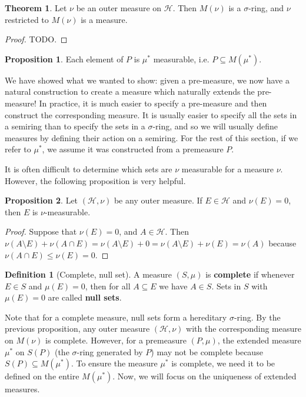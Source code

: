 \documentclass[11pt, oneside]{amsart}   	%
\theoremstyle{definition}
\newtheorem{definition}{Definition}[section]
\newtheorem{theorem}{Theorem}[section]
\newtheorem{prop}{Proposition}[section]
\begin{document}
	\begin{theorem}
		Let $\nu$ be an outer measure on $\mathcal H$. Then $M(\nu)$ is a $\sigma$-ring, and $\nu$ restricted to $M(\nu)$ 
		is a 
		measure.
	\end{theorem}
	
	\begin{proof}
		TODO.
	\end{proof}
	
	\begin{prop}
		Each element of $P$ is $\mu^*$ measurable, i.e. $P\subseteq M(\mu^*)$. 
	\end{prop}
	
	We have showed what we wanted to show: given a pre-measure, we now have a natural construction to create a measure 
	which naturally extends the pre-measure! In practice, it is much easier to specify a pre-measure and then construct the 
	corresponding measure. It is usually easier to specify all the sets in a semiring than to specify the sets in a $\sigma$-ring, 
	and so we will usually define measures by defining their action on a semiring. For the rest of this section, if we refer to 
	$\mu^*$, we assume it was constructed from a premeasure $P$. 
	
	It is often difficult to determine which sets are $\nu$ measurable for a measure $\nu$. However, the following proposition 
	is very helpful.
	
	\begin{prop}
		Let $(\mathcal H, \nu)$ be any outer measure. If $E\in\mathcal H$ and $\nu(E) = 0$, then $E$ is $\nu$-measurable.
	\end{prop}
	
	\begin{proof}
		Suppose that $\nu(E) = 0$, and $A\in\mathcal H$. Then $\nu(A\setminus E) + \nu(A\cap E) = \nu(A\setminus E) + 0 = 
		\nu(A\setminus E) + \nu(E) = \nu(A)$ because $\nu(A\cap E)\leq\nu(E) = 0$.
	\end{proof}
	
	\begin{definition}[Complete, null set]
		A measure $(S, \mu)$ is \textbf{complete} if whenever $E\in S$ and $\mu(E) = 0$, then for all $A\subseteq E$ we 
		have $A\in S$. Sets in $S$ with $\mu(E) = 0$ are called \textbf{null sets}.
	\end{definition}
	
	Note that for a complete measure, null sets form a hereditary $\sigma$-ring. By the previous proposition, any outer 
	measure $(\mathcal H, \nu)$ with the corresponding measure on $M(\nu)$ is complete. However, for a premeasure $(P, 
	\mu)$, the extended measure $\mu^*$ on $S(P)$ (the $\sigma$-ring generated by $P$) may not be complete because 
	$S(P)\subseteq M(\mu^*)$. To ensure the measure $\mu^*$ is complete, we need it to be defined on the entire 
	$M(\mu^*)$. Now, we will focus on the uniqueness of extended measures. 
	
\end{document}
